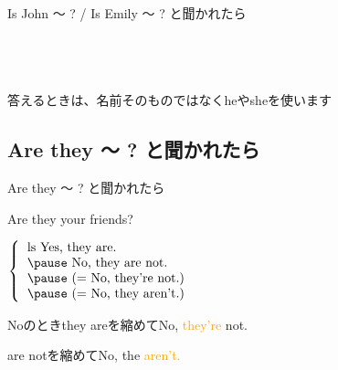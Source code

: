 \documentclass[aspectratio=169]{beamer}
\newcommand{\myaudio}[1]{\href{#1}{\faVolumeUp}}
\begin{document}
\begin{frame}[plain]{Is John  〜 ? / Is Emily 〜 ? と聞かれたら}
\begin{columns}[t]
\begin{column}{.49\textwidth}
\pause

\vspace{20pt}

\mbox{}\hfill\myaudio{./audio/009_question_be_03.mp3}\,\,{}
\end{column}
\end{columns}

\pause

{\small 答えるときは、名前そのものではなくheやsheを使います}
\end{frame}

 \subsection{Are they 〜 ? と聞かれたら}
\begin{frame}[plain]{Are they 〜 ? と聞かれたら}
 \Large


\pause

Are they your friends?

\pause

\vspace{10pt}

\mbox{}\hspace{100pt}$\left\{\begin{tabular}{l}ls
         Yes, they are.\\\pause
         No, they are not.\\\pause
         \text{(}= \text{No, they're not.)}\\\pause
         \text{(}= \text{No, they aren't.)}
        \end{tabular}\right.$
\vspace{10pt}

\mbox{}\hfill{}{\small Noのときthey areを縮めてNo, \textcolor{orange}{they're} not.}

\vspace{-8pt}

\mbox{}\hfill{}{\small \phantom{Noのとき}are notを縮めてNo, the \textcolor{orange}{aren't.}}

\vspace{20pt}

\mbox{}\hfill\myaudio{./audio/009_question_be_04.mp3}\,\,{}
\end{frame}
\end{document}
